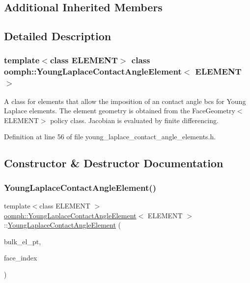 \subsection*{Additional Inherited Members}


\subsection{Detailed Description}
\subsubsection*{template$<$class E\+L\+E\+M\+E\+NT$>$\newline
class oomph\+::\+Young\+Laplace\+Contact\+Angle\+Element$<$ E\+L\+E\+M\+E\+N\+T $>$}

A class for elements that allow the imposition of an contact angle bcs for Young Laplace elements. The element geometry is obtained from the Face\+Geometry$<$\+E\+L\+E\+M\+E\+N\+T$>$ policy class. Jacobian is evaluated by finite differencing. 

Definition at line 56 of file young\+\_\+laplace\+\_\+contact\+\_\+angle\+\_\+elements.\+h.



\subsection{Constructor \& Destructor Documentation}
\mbox{\label{classoomph_1_1YoungLaplaceContactAngleElement_a357c030b7a30cf89a670524e1def7d92}} 
\subsubsection{\texorpdfstring{Young\+Laplace\+Contact\+Angle\+Element()}{YoungLaplaceContactAngleElement()}\hspace{0.1cm}{\footnotesize\ttfamily [1/3]}}
{\footnotesize\ttfamily template$<$class E\+L\+E\+M\+E\+NT $>$ \\
\hyperlink{classoomph_1_1YoungLaplaceContactAngleElement}{oomph\+::\+Young\+Laplace\+Contact\+Angle\+Element}$<$ E\+L\+E\+M\+E\+NT $>$\+::\hyperlink{classoomph_1_1YoungLaplaceContactAngleElement}{Young\+Laplace\+Contact\+Angle\+Element} (\begin{DoxyParamCaption}\item[{\hyperlink{classoomph_1_1FiniteElement}{Finite\+Element} $\ast$const \&}]{bulk\+\_\+el\+\_\+pt,  }\item[{const int \&}]{face\+\_\+index }\end{DoxyParamCaption})}



